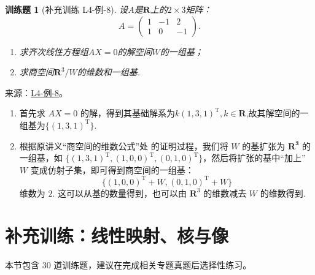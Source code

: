 \documentclass[UTF8,12pt,a4paper,fontset=fandol]{ctexart}
\newtheorem{exercise}{训练题}[section]
\begin{document}
\begin{exercise}[补充训练 L4-例-8]\label{prob:L4-例-8}
设$A$是$\mathbf{R}$上的$2\times 3$矩阵：
    \[A=\begin{pmatrix}
            1 & -1 & 2 \\ 1 & 0 & -1
        \end{pmatrix}.\]
    \begin{enumerate}
        \item 求齐次线性方程组$AX=0$的解空间$W$的一组基；

        \item 求商空间$\mathbf{R}^3/W$的维数和一组基.
    \end{enumerate}
\end{exercise}
\noindent 来源：\href{https://github.com/yhwu-is/Linear-Algebra-Left-Undone/blob/new/%E8%AE%B2%E4%B9%89/%E4%B8%93%E9%A2%98/4%20%E7%BA%BF%E6%80%A7%E7%A9%BA%E9%97%B4%E7%9A%84%E8%BF%90%E7%AE%97.tex}{L4-例-8}。
\begin{solve}
\begin{enumerate}
        \item 首先求 $AX=0$ 的解，得到其基础解系为$k(1,3,1)^{\mathrm{T}},k \in \mathbf{R}$,故其解空间的一组基为$\{(1,3,1)^{\mathrm{T}}\}$.
        \item 根据原讲义“商空间的维数公式”处 的证明过程，我们将 $W$ 的基扩张为 $\mathbf{R^3}$ 的一组基，如 $\{(1,3,1)^{\mathrm{T}},(1,0,0)^{\mathrm{T}},(0,1,0)^{\mathrm{T}}\}$，然后将扩张的基中``加上'' $W$ 变成仿射子集，即可得到商空间的一组基：
        \[
            \{(1,0,0)^{\mathrm{T}}+W,(0,1,0)^{\mathrm{T}}+W\}
        \]
        维数为 $2$. 这可以从基的数量得到，也可以由 $\mathbf{R}^3$ 的维数减去 $W$ 的维数得到.

    \end{enumerate}
\end{solve}

\section{补充训练：线性映射、核与像}

本节包含 30 道训练题，建议在完成相关专题真题后选择性练习。
\end{document}
